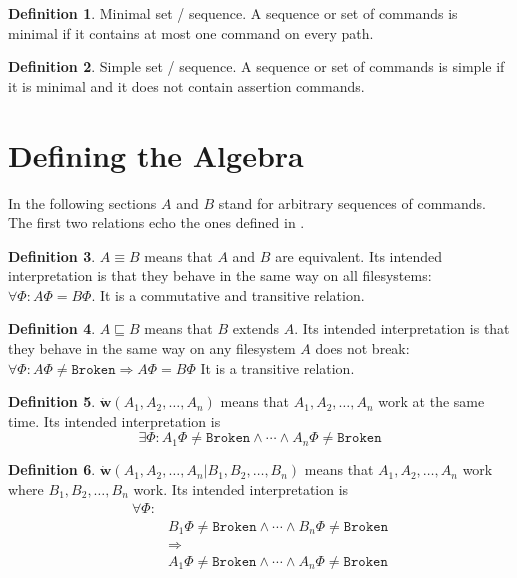 \documentclass[12pt]{article}
\newcommand{\fsbroken}{\mathtt{Broken}} %
\newcommand{\FS}{\Phi} %
\newcommand{\eqext}{\sqsubseteq}
\newcommand{\works}[1]{\dot{\mathbf{w}}({#1})}
\newcommand{\worksc}[2]{\dot{\mathbf{w}}({#1}|{#2})}
\theoremstyle{definition}
\newtheorem{mydef}{Definition}
\begin{document}
\begin{mydef}{Minimal set / sequence.}
A sequence or set of commands is minimal if it contains at most one command on every path.
\end{mydef}

\begin{mydef}{Simple set / sequence.}
A sequence or set of commands is simple if it is minimal and it does not contain assertion commands.
\end{mydef}


\section{Defining the Algebra}

In the following sections $A$ and $B$ stand for arbitrary sequences of commands.
The first two relations echo the ones defined in \cite{NREC:alg}.

\begin{mydef}
$A\equiv B$ means that $A$ and $B$ are equivalent.
Its intended interpretation is that they behave in the same way on
all filesystems: $\forall \FS: A\FS=B\FS$.
It is a commutative and transitive relation.
\end{mydef}

\begin{mydef}
$A\eqext B$ means that $B$ extends $A$.
Its intended interpretation is that they behave in the same way
on any filesystem $A$ does not break:
$\forall \FS: A\FS\neq\fsbroken\Rightarrow A\FS=B\FS$
It is a transitive relation.
\end{mydef}

\begin{mydef}
$\works{A_1,A_2,\ldots,A_n}$ means that 
$A_1,A_2,\ldots,A_n$ work at the same time.
Its intended interpretation is
\[\exists \FS: A_1\FS\neq\fsbroken \wedge \cdots \wedge A_n\FS\neq\fsbroken\]
\end{mydef}

\begin{mydef}
$\worksc{A_1,A_2,\ldots,A_n}{B_1,B_2,\ldots,B_n}$ means that 
$A_1,A_2,\ldots,A_n$ work where $B_1,B_2,\ldots,B_n$ work.
Its intended interpretation is
\begin{align*}
\forall \FS:&\\ 
&B_1\FS\neq\fsbroken \wedge \cdots \wedge B_n\FS\neq\fsbroken\\
&\Rightarrow\\
&A_1\FS\neq\fsbroken \wedge \cdots \wedge A_n\FS\neq\fsbroken
\end{align*}
\end{mydef}
\end{document}
